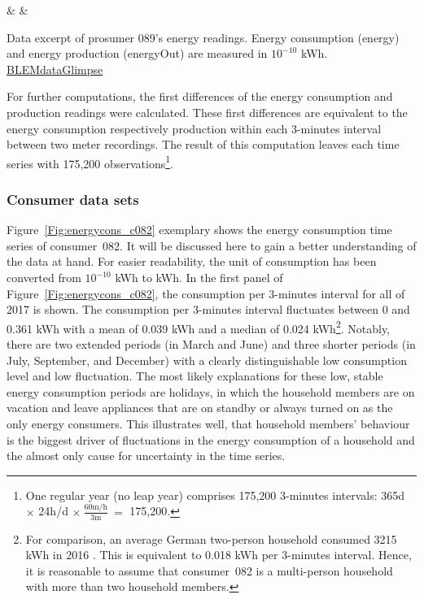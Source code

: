 \begin{table}[htbp]
    {\csvcolii & \csvcoliii & \csvcoliv}%
    \caption[Data excerpt of prosumer~089's energy readings]{Data excerpt of prosumer 089's energy readings. Energy consumption (energy) and energy production (energyOut) are measured in $10^{-10}$ kWh. \quantnet\href{https://github.com/QuantLet/BLEM/tree/master/BLEMdataGlimpse}{BLEMdataGlimpse}}
    \label{Tab:p089}
\end{table}
%

For further computations, the first differences of the energy consumption and production readings were calculated. These first differences are equivalent to the energy consumption respectively production within each 3-minutes interval between two meter recordings. The result of this computation leaves each time series with 175,200 observations\footnote{One regular year (no leap year) comprises 175,200 3-minutes intervals: 365d $\times$ 24h/d $\times~\frac{60\text{m/h}}{3\text{m}}~=$ 175,200.}.



\subsubsection{Consumer data sets}

Figure~\ref{Fig:energycons_c082} exemplary shows the energy consumption time series of consumer~082. It will be discussed here to gain a better understanding of the data at hand. For easier readability, the unit of consumption has been converted from $10^{-10}$ kWh to kWh. In the first panel of Figure~\ref{Fig:energycons_c082}, the consumption per 3-minutes interval for all of 2017 is shown. The consumption per 3-minutes interval fluctuates between 0 and 0.361 kWh with a mean of 0.039 kWh and a median of 0.024 kWh\footnote{For comparison, an average German two-person household consumed 3215 kWh in 2016 \citep{Destatis:2018}. This is equivalent to 0.018 kWh per 3-minutes interval. Hence, it is reasonable to assume that consumer~082 is a multi-person household with more than two household members.}. Notably, there are two extended periods (in March and June) and three shorter periods (in July, September, and December) with a clearly distinguishable low consumption level and low fluctuation. The most likely explanations for these low, stable energy consumption periods are holidays, in which the household members are on vacation and leave appliances that are on standby or always turned on as the only energy consumers. This illustrates well, that household members' behaviour is the biggest driver of fluctuations in the energy consumption of a household and the almost only cause for uncertainty in the time series.

